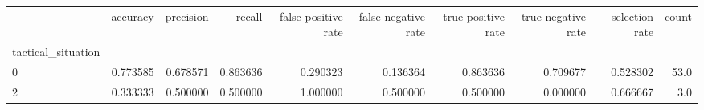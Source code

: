\begin{tabular}{lrrrrrrrrr}
\toprule
{} &  accuracy &  precision &    recall &  false positive rate &  false negative rate &  true positive rate &  true negative rate &  selection rate &  count \\
tactical\_situation &           &            &           &                      &                      &                     &                     &                 &        \\
\midrule
0                  &  0.773585 &   0.678571 &  0.863636 &             0.290323 &             0.136364 &            0.863636 &            0.709677 &        0.528302 &   53.0 \\
2                  &  0.333333 &   0.500000 &  0.500000 &             1.000000 &             0.500000 &            0.500000 &            0.000000 &        0.666667 &    3.0 \\
\bottomrule
\end{tabular}
